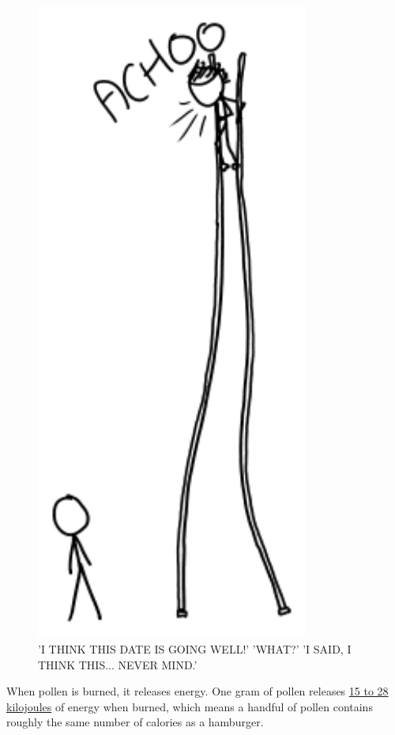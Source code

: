 {\begin{figure}[!htbp]
\centering
\includegraphics[scale=0.5, max width=0.8\textwidth]{imgs/a/97/stilts.png}
\caption{'I THINK THIS DATE IS GOING WELL!' 'WHAT?' 'I SAID, I THINK THIS... NEVER MIND.'}
\end{figure}

{When pollen is burned, it releases energy. One gram of pollen releases \href{http://www.inkcorrosion.org/reports/000592/front.pdf}{15 to 28 kilojoules} of energy when burned, which means a handful of pollen contains roughly the same number of calories as a hamburger.}

}
